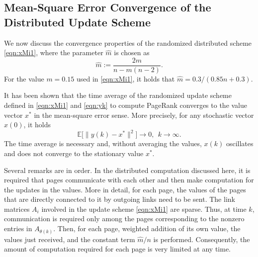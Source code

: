 \documentclass[11pt,draftcls,onecolumn]{IEEEtran}
\newcommand{\field}[1]{{\mathbb{#1}}}
\newcommand{\one}{\mathbf{1}}
\newcommand{\E}{\field{E}}
\begin{document}

\subsection*{Mean-Square Error Convergence of the Distributed Update Scheme}

We now discuss 
the convergence properties of the randomized distributed scheme \eqref{eqn:xMi1}, 
where the parameter $\hat{m}$ is chosen as
\begin{equation*}
   \hat{m} := \frac{2m}{n - m(n-2)}.
\end{equation*}
For the value $m=0.15$ used in \eqref{eqn:xMi1},
it holds that $\hat{m} = 0.3/(0.85n+0.3)$. 

It has been shown \cite{IshTem:10} that the time average of the randomized 
update scheme defined in \eqref{eqn:xMi1} and \eqref{eqn:yk} to compute PageRank 
converges to the value vector $x^*$ in the mean-square error sense. 
More precisely, for any stochastic vector $x(0)$, it holds
$$
\E\bigl[
   \bigl\|
      y(k) - x^*
   \bigr\|^2
  \bigr] \rightarrow 0,~~k\rightarrow\infty.
$$
The time average is necessary and, without averaging the values, 
$x(k)$ oscillates and does not converge to the stationary value $x^*$.

Several remarks are in order. 
In the distributed computation discussed here,
it is required that pages communicate with each other and 
then make computation for the updates in the values. 
More in detail, for each page, the values of the 
pages that are directly connected to it by outgoing links need to be
sent. The link matrices $A_i$ involved in the update scheme \eqref{eqn:xMi1}
are sparse. Thus, at time $k$, communication 
is required only among the pages corresponding to the nonzero entries
in $A_{\theta(k)}$. 
Then, for each page, weighted addition of its own value, the values 
just received, and the constant term $\hat{m}/n$ is performed.
Consequently, the amount of computation required 
for each page is very limited at any time.
\end{document}
